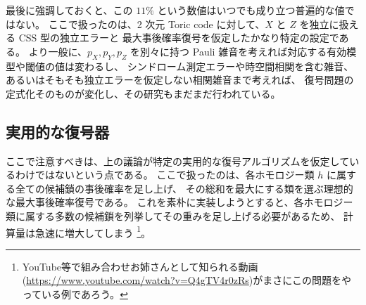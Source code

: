 \documentclass[../master.tex]{subfiles}
\begin{document}
最後に強調しておくと、この \(11\%\) という数値はいつでも成り立つ普遍的な値ではない。
ここで扱ったのは、2 次元 Toric code に対して、\(X\) と \(Z\) を独立に扱える CSS 型の独立エラーと
最大事後確率復号を仮定したかなり特定の設定である。
より一般に、\(p_X,p_Y,p_Z\) を別々に持つ Pauli 雑音を考えれば対応する有効模型や閾値の値は変わるし、
シンドローム測定エラーや時空間相関を含む雑音、あるいはそもそも独立エラーを仮定しない相関雑音まで考えれば、
復号問題の定式化そのものが変化し、その研究もまだまだ行われている\cite{Chubb2018-sb}。


\subsection*{実用的な復号器}

ここで注意すべきは、上の議論が特定の実用的な復号アルゴリズムを仮定しているわけではないという点である。
ここで扱ったのは、各ホモロジー類 \(h\) に属する全ての候補鎖の事後確率を足し上げ、
その総和を最大にする類を選ぶ理想的な最大事後確率復号である。
これを素朴に実装しようとすると、各ホモロジー類に属する多数の候補鎖を列挙してその重みを足し上げる必要があるため、
計算量は急速に増大してしまう
\footnote{YouTube等で組み合わせお姉さんとして知られる動画(\url{https://www.youtube.com/watch?v=Q4gTV4r0zRs})がまさにこの問題をやっている例であろう。}。
\end{document}

